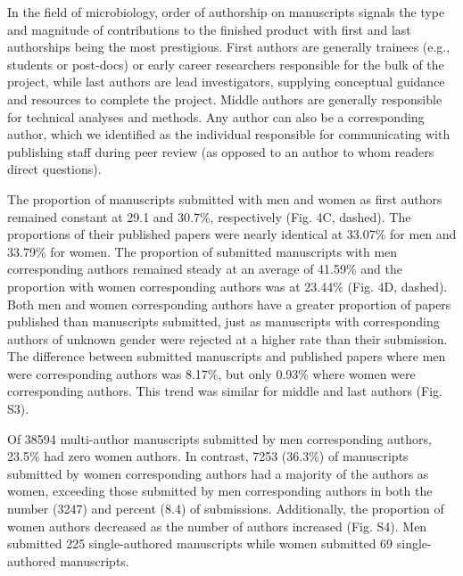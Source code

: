 \documentclass[11pt,]{article}
\begin{document}
In the field of microbiology, order of authorship on manuscripts signals
the type and magnitude of contributions to the finished product with
first and last authorships being the most prestigious. First authors are
generally trainees (e.g., students or post-docs) or early career
researchers responsible for the bulk of the project, while last authors
are lead investigators, supplying conceptual guidance and resources to
complete the project. Middle authors are generally responsible for
technical analyses and methods. Any author can also be a corresponding
author, which we identified as the individual responsible for
communicating with publishing staff during peer review (as opposed to an
author to whom readers direct questions).

The proportion of manuscripts submitted with men and women as first
authors remained constant at 29.1 and 30.7\%, respectively (Fig. 4C,
dashed). The proportions of their published papers were nearly identical
at 33.07\% for men and 33.79\% for women. The proportion of submitted
manuscripts with men corresponding authors remained steady at an average
of 41.59\% and the proportion with women corresponding authors was at
23.44\% (Fig. 4D, dashed). Both men and women corresponding authors have
a greater proportion of papers published than manuscripts submitted,
just as manuscripts with corresponding authors of unknown gender were
rejected at a higher rate than their submission. The difference between
submitted manuscripts and published papers where men were corresponding
authors was 8.17\%, but only 0.93\% where women were corresponding
authors. This trend was similar for middle and last authors (Fig. S3).

Of 38594 multi-author manuscripts submitted by men corresponding
authors, 23.5\% had zero women authors. In contrast, 7253 (36.3\%) of
manuscripts submitted by women corresponding authors had a majority of
the authors as women, exceeding those submitted by men corresponding
authors in both the number (3247) and percent (8.4) of submissions.
Additionally, the proportion of women authors decreased as the number of
authors increased (Fig. S4). Men submitted 225 single-authored
manuscripts while women submitted 69 single-authored manuscripts.
\end{document}
